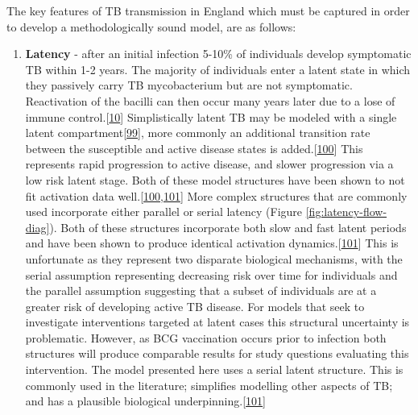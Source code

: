 \documentclass[11pt,twoside]{bristolthesis}
\providecommand{\tightlist}{%
  \setlength{\itemsep}{0pt}\setlength{\parskip}{0pt}}
\begin{document}
  The key features of TB transmission in England which must be captured in order to develop a methodologically sound model, are as follows:
  \begin{enumerate}
  \def\labelenumi{\arabic{enumi}.}
  \tightlist
  \item
    \textbf{Latency} - after an initial infection 5-10\% of individuals develop symptomatic TB within 1-2 years. The majority of individuals enter a latent state in which they passively carry TB mycobacterium but are not symptomatic. Reactivation of the bacilli can then occur many years later due to a lose of immune control.{[}\protect\hyperlink{ref-Gideon2011a}{10}{]} Simplistically latent TB may be modeled with a single latent compartment{[}\protect\hyperlink{ref-Brooks-Pollock2010a}{99}{]}, more commonly an additional transition rate between the susceptible and active disease states is added.{[}\protect\hyperlink{ref-Menzies2018}{100}{]} This represents rapid progression to active disease, and slower progression via a low risk latent stage. Both of these model structures have been shown to not fit activation data well.{[}\protect\hyperlink{ref-Menzies2018}{100},\protect\hyperlink{ref-Ragonnet2017}{101}{]} More complex structures that are commonly used incorporate either parallel or serial latency (Figure \ref{fig:latency-flow-diag}). Both of these structures incorporate both slow and fast latent periods and have been shown to produce identical activation dynamics.{[}\protect\hyperlink{ref-Ragonnet2017}{101}{]} This is unfortunate as they represent two disparate biological mechanisms, with the serial assumption representing decreasing risk over time for individuals and the parallel assumption suggesting that a subset of individuals are at a greater risk of developing active TB disease. For models that seek to investigate interventions targeted at latent cases this structural uncertainty is problematic. However, as BCG vaccination occurs prior to infection both structures will produce comparable results for study questions evaluating this intervention. The model presented here uses a serial latent structure. This is commonly used in the literature; simplifies modelling other aspects of TB; and has a plausible biological underpinning.{[}\protect\hyperlink{ref-Ragonnet2017}{101}{]}
  \end{enumerate}
\end{document}
